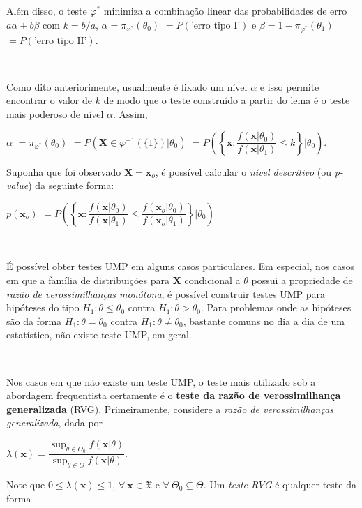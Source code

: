 \documentclass[
]{book}
\begin{document}
Além disso, o teste \({\varphi}^*\) minimiza a combinação linear das probabilidades de erro \(a\alpha+b\beta\) com \(k=b/a\), \(\alpha={\pi}_{{\varphi}^*}(\theta_0)\) \(=P(\textrm{'erro tipo I'})\) e \(\beta=1-{\pi}_{{\varphi}^*}(\theta_1)\) \(=P(\textrm{'erro tipo II'})\).

\(~\)

Como dito anteriorimente, usualmente é fixado um nível \(\alpha\) e isso permite encontrar o valor de \(k\) de modo que o teste construído a partir do lema é o teste mais poderoso de nível \(\alpha\). Assim,

\(\alpha\) \(={\pi}_{\varphi^*}(\theta_0)\) \(=P\left(\boldsymbol X \in {\varphi}^{-1}(\{1\})|\theta_0\right)\) \(=P\left(\left\{\boldsymbol x: \dfrac{f(\boldsymbol x|\theta_0)}{f(\boldsymbol x|\theta_1)} \leq k\right\}\Big|\theta_0\right)\).

Suponha que foi observado \(\boldsymbol X = \boldsymbol x_o\), é possível calcular o \emph{nível descritivo} (ou \emph{p-value}) da seguinte forma:

\(p(\boldsymbol x_o)\) \(=P\left(\left\{\boldsymbol x: \dfrac{f(\boldsymbol x|\theta_0)}{f(\boldsymbol x|\theta_1)} \leq \dfrac{f(\boldsymbol x_o|\theta_0)}{f(\boldsymbol x_o|\theta_1)}\right\}\Big|\theta_0\right)\)

\(~\)

É possível obter testes UMP em alguns casos particulares. Em especial, nos casos em que a família de distribuições para \(\boldsymbol X\) condicional a \(\theta\) possui a propriedade de \emph{razão de verossimilhanças monótona}, é possível construir testes UMP para hipóteses do tipo \(H_1: \theta \leq \theta_0\) contra \(H_1: \theta > \theta_0\). Para problemas onde as hipóteses são da forma \(H_1: \theta = \theta_0\) contra \(H_1: \theta \neq \theta_0\), bastante comuns no dia a dia de um estatístico, não existe teste UMP, em geral.

\(~\)

Nos casos em que não existe um teste UMP, o teste mais utilizado sob a abordagem frequentista certamente é o \textbf{teste da razão de verossimilhança generalizada} (RVG). Primeiramente, considere a \emph{razão de verossimilhanças generalizada}, dada por

\(\lambda(\boldsymbol x)=\dfrac{\displaystyle \sup_{\theta\in\Theta_0} f(\boldsymbol x|\theta)}{\displaystyle \sup_{\theta\in\Theta} f(\boldsymbol x|\theta)}\).

Note que \(0\leq \lambda(\boldsymbol x) \leq 1\), \(\forall ~\boldsymbol x \in \mathfrak{X}\) e \(\forall ~\Theta_0 \subseteq \Theta\). Um \emph{teste RVG} é qualquer teste da forma
\end{document}
